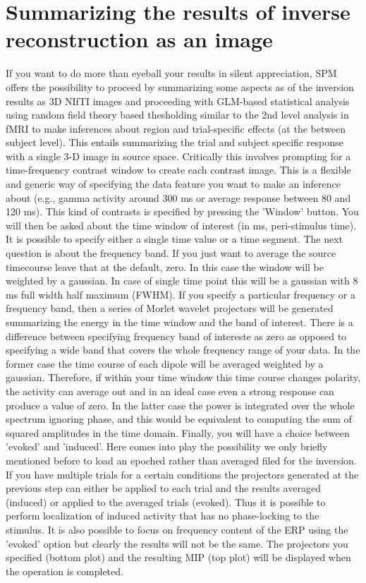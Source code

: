 \section{Summarizing the results of inverse reconstruction as an image}
If you want to do more than eyeball your results in silent appreciation, SPM offers the possibility to proceed by summarizing some aspects
as of the inversion results as 3D NIfTI images and proceeding with GLM-based statistical analysis using random field theory based thesholding similar
to the 2nd level analysis in fMRI to make inferences about region and trial-specific effects (at the between subject level).
This entails summarizing the trial and subject specific response with a single 3-D 
image in source space. Critically this involves prompting for a time-frequency contrast window to create each contrast image.
This is a flexible and generic way of specifying the data feature you want to make an inference about (e.g., gamma activity around 300 
ms or average response between 80 and 120 ms). This kind of contrasts is specified by pressing the 'Window' button. You will then be asked about
the time window of interest (in ms, peri-stimulus time). It is possible to specify either a single time value or a time segment. The next question is about the frequency band.
If you just want to average the source timecourse leave that at the default, zero. In this case the window will
be weighted by a gaussian. In case of single time point this will be a gaussian with 8 ms full width half maximum (FWHM). 
If you specify a particular frequency or a frequency band, then a series of Morlet wavelet projectors
will be generated summarizing the energy in the time window and the band of interest. There is a difference between specifying frequency band of intereste as zero as opposed
to specifying a wide band that covers the whole frequency range of your data. In the former case the time course of each dipole will be averaged weighted by a gaussian. Therefore,
if within your time window this time course changes polarity, the activity can average out and in an ideal case even a strong response can produce a value of zero. In the latter case
the power is integrated over the whole spectrum ignoring phase, and this would be equivalent to computing the sum of squared amplitudes in the time domain. 
Finally, you will have a choice between 'evoked' and 'induced'. Here comes into play
the possibility we only briefly mentioned before to load an epoched rather than averaged filed for the inversion. If you have multiple trials for a certain conditions
the projectors generated at the previous step can either be applied to each trial and the results averaged (induced) or applied to the averaged trials (evoked). Thus it is
possible to perform localization of induced activity that has no phase-locking to the stimulus. It is also possible to focus on frequency content of the ERP using the 'evoked'
option but clearly the results will not be the same. The projectors you specified (bottom plot) and the resulting MIP (top plot) will be displayed when the operation is completed.

